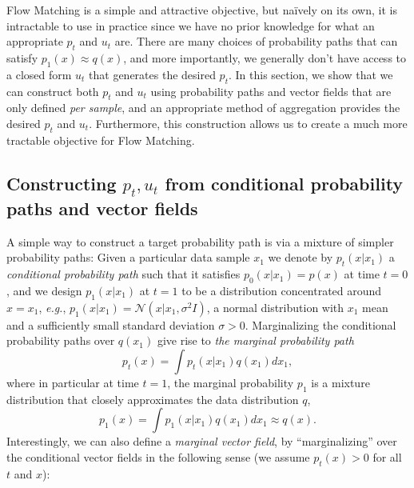 \documentclass{article}
\makeatletter
\newcommand{\eg}{{e.g.}}
\def\gN{{\mathcal{N}}}
\newcommand{\marginal}{marginal\@\xspace}
\renewcommand*{\eg}{{\it e.g.}\@\xspace}
\makeatother
\begin{document}
Flow Matching is a simple and attractive objective, but na\"ively on its own, it is intractable to use in practice since we have no prior knowledge for what an appropriate $p_t$ and $u_t$ are.
There are many choices of probability paths that can satisfy $p_1(x) \approx q(x)$, and more importantly, we generally don't have access to a closed form $u_t$ that generates the desired $p_t$. 
%
In this section, we show that we can construct both $p_t$ and $u_t$ using probability paths and vector fields that are only defined \emph{per sample}, and an appropriate method of aggregation provides the desired $p_t$ and $u_t$. 
Furthermore, this construction allows us to create a much more tractable objective for Flow Matching.

\subsection{Constructing $p_t,u_t$ from conditional probability paths and vector fields} 
A simple way to construct a target probability path is via a mixture of simpler probability paths: Given a particular data sample $x_1$ we denote by $p_t(x\vert x_1)$ a \emph{conditional probability path} 
such that it satisfies $p_0(x|x_1) = p(x)$ at time $t=0$, and we design $p_1(x|x_1)$ at $t=1$ to be a distribution concentrated around $x=x_1$, \eg, $p_1(x|x_1)=\gN(x|x_1,\sigma^2 I)$, a normal distribution with $x_1$ mean and a sufficiently small standard deviation $\sigma > 0$. 
Marginalizing the conditional probability paths over $q(x_1)$ give rise to \emph{the \marginal probability path}
\begin{equation}\label{e:p_t}
    p_t(x)=\int p_t(x|x_1)q(x_1)dx_1,
\end{equation}
where in particular at time $t=1$, the \marginal probability $p_1$ is a mixture distribution that closely approximates the data distribution $q$,
\begin{equation}\label{e:p_1} 
    p_1(x)=\int p_1(x|x_1)q(x_1)dx_1\approx q(x).
\end{equation}
%
Interestingly, we can also define a \emph{\marginal vector field}, by ``marginalizing'' over the conditional vector fields in the following sense (we assume $p_t(x)>0$ for all $t$ and $x$):
\end{document}
